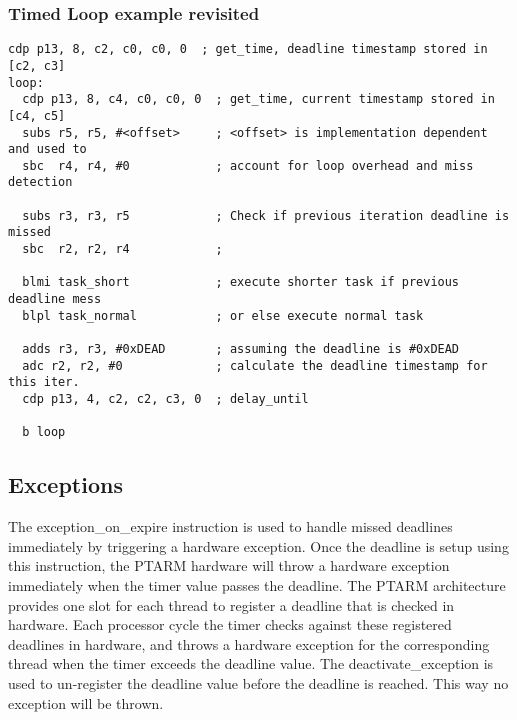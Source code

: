  
\subsubsection{Timed Loop example revisited}
\begin{lstlisting}[float=h, label=lst:timed_loop_compensate,caption=Timed loops with compensation ]
  cdp p13, 8, c2, c0, c0, 0  ; get_time, deadline timestamp stored in [c2, c3]
loop:
  cdp p13, 8, c4, c0, c0, 0  ; get_time, current timestamp stored in [c4, c5]
  subs r5, r5, #<offset>     ; <offset> is implementation dependent and used to 
  sbc  r4, r4, #0            ; account for loop overhead and miss detection

  subs r3, r3, r5            ; Check if previous iteration deadline is missed
  sbc  r2, r2, r4            ; 

  blmi task_short            ; execute shorter task if previous deadline mess 
  blpl task_normal           ; or else execute normal task 
  
  adds r3, r3, #0xDEAD       ; assuming the deadline is #0xDEAD
  adc r2, r2, #0             ; calculate the deadline timestamp for this iter.
  cdp p13, 4, c2, c2, c3, 0  ; delay_until
   
  b loop
\end{lstlisting}


\subsection{Exceptions}
The exception\_on\_expire instruction is used to handle missed deadlines immediately by triggering a hardware exception. 
Once the deadline is setup using this instruction, the PTARM hardware will throw a hardware exception immediately when the timer value passes the deadline.
The PTARM architecture provides one slot for each thread to register a deadline that is checked in hardware.
Each processor cycle the timer checks against these registered deadlines in hardware, and throws a hardware exception for the corresponding thread when the timer exceeds the deadline value. 
The deactivate\_exception is used to un-register the deadline value before the deadline is reached. 
This way no exception will be thrown.

